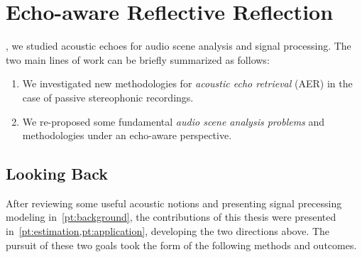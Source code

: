 \chapter{Echo-aware Reflective Reflection}\label{ch:conclusion}


\vspace{-2.5em}
, we studied acoustic echoes for audio scene analysis and signal processing.
The two main lines of work can be briefly summarized as follows:
\begin{enumerate}[label=\Alph*.]
    \item We investigated new methodologies for \textit{acoustic echo retrieval} (AER) in the case of passive stereophonic recordings.
    \item We re-proposed some fundamental \textit{audio scene analysis problems} and methodologies under an echo-aware perspective.
\end{enumerate}

\section{Looking Back}
After reviewing some useful acoustic notions and presenting signal precessing modeling in~\cref{pt:background}, the contributions of this thesis were presented in~\cref{pt:estimation,pt:application}, developing the two directions above.
The pursuit of these two goals took the form of the following methods and outcomes.

